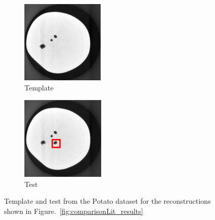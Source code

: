 \documentclass{article}
\begin{document}
\begin{figure}[!h]
    \begin{subfigure}[b]{0.4\linewidth}
        \includegraphics[width=\textwidth]{../images/potato/template_3.png}
        \caption{Template}
     \end{subfigure}
\quad
    \begin{subfigure}[b]{0.4\linewidth}
        \includegraphics[width=\textwidth]{../images/potato/testIm_color.png}
        \caption{Test}
    \end{subfigure}
     \caption{Template and test from the Potato dataset for the reconstructions shown in Figure.~\ref{fig:comparisonLit_results}} 
\label{fig:comparisonLit_dataset}
\end{figure}
\newpage
\end{document}
